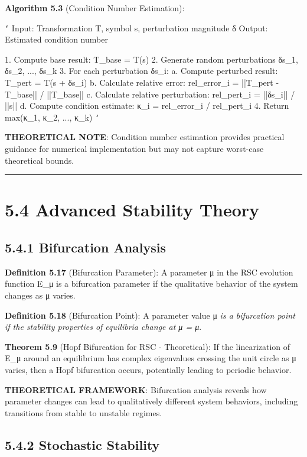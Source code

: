 \textbf{Algorithm 5.3} (Condition Number Estimation):

\texttt{`}
Input: Transformation T, symbol s, perturbation magnitude δ
Output: Estimated condition number

1. Compute base result: T_base = T(s)
2. Generate random perturbations {δs_1, δs_2, ..., δs_k}
3. For each perturbation δs_i:
   a. Compute perturbed result: T_pert = T(s + δs_i)
   b. Calculate relative error: rel_error_i = ||T_pert - T_base|| / ||T_base||
   c. Calculate relative perturbation: rel_pert_i = ||δs_i|| / ||s||
   d. Compute condition estimate: κ_i = rel_error_i / rel_pert_i
4. Return max(κ_1, κ_2, ..., κ_k)
\texttt{`}

\textbf{THEORETICAL NOTE}: Condition number estimation provides practical guidance for numerical implementation but may not capture worst-case theoretical bounds.

\hrule

\section{5.4 Advanced Stability Theory}

\subsection{5.4.1 Bifurcation Analysis}

\textbf{Definition 5.17} (Bifurcation Parameter): A parameter μ in the RSC evolution function E_μ is a bifurcation parameter if the qualitative behavior of the system changes as μ varies.

\textbf{Definition 5.18} (Bifurcation Point): A parameter value μ\textit{ is a bifurcation point if the stability properties of equilibria change at μ = μ}.

\textbf{Theorem 5.9} (Hopf Bifurcation for RSC - Theoretical): If the linearization of E_μ around an equilibrium has complex eigenvalues crossing the unit circle as μ varies, then a Hopf bifurcation occurs, potentially leading to periodic behavior.

\textbf{THEORETICAL FRAMEWORK}: Bifurcation analysis reveals how parameter changes can lead to qualitatively different system behaviors, including transitions from stable to unstable regimes.

\subsection{5.4.2 Stochastic Stability}

